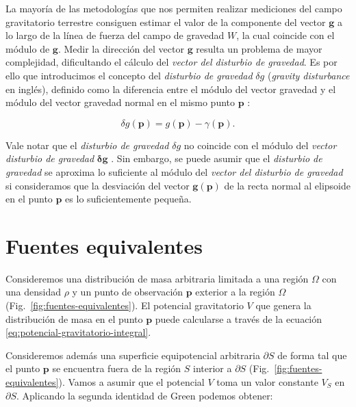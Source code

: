 La mayoría de las metodologías que nos permiten realizar mediciones del campo
gravitatorio terrestre consiguen estimar el valor de la componente del vector
$\mathbf{g}$ a lo largo de la línea de fuerza del campo de gravedad $W$, la
cual coincide con el módulo de $\mathbf{g}$.
Medir la dirección del vector $\mathbf{g}$ resulta un problema de mayor
complejidad, dificultando el cálculo del \emph{vector del disturbio de
gravedad}.
Es por ello que introducimos el concepto del \emph{disturbio de gravedad}
$\delta g$ (\emph{gravity disturbance} en inglés), definido como la diferencia
entre el módulo del vector gravedad y el módulo del vector gravedad normal en
el mismo punto $\mathbf{p}$
\citep{heiskanen1967,hofmannwellenhof2005,oliveira2018}:

\begin{equation}
    \delta g(\mathbf{p}) =
        g(\mathbf{p}) - \gamma(\mathbf{p}).
    \label{eq:gravity-disturbance}
\end{equation}

Vale notar que el \emph{disturbio de gravedad} $\delta g$ no coincide con el
módulo del \emph{vector disturbio de gravedad} $\boldsymbol\delta \mathbf{g}$
\citep{barthelmes2013,sanso2013,oliveira2018}.
Sin embargo, se puede asumir que el \emph{disturbio de gravedad} se aproxima lo
suficiente al módulo del \emph{vector del disturbio de gravedad} si
consideramos que la desviación del vector $\mathbf{g}(\mathbf{p})$ de la recta
normal al elipsoide en el punto $\mathbf{p}$ es lo suficientemente pequeña.


\section{Fuentes equivalentes}

Consideremos una distribución de masa arbitraria limitada a una región $\Omega$
con una densidad $\rho$ y un punto de observación $\mathbf{p}$ exterior a la
región $\Omega$ (Fig.~\ref{fig:fuentes-equivalentes}).
El potencial gravitatorio $V$ que genera la distribución de masa en el punto
$\mathbf{p}$ puede calcularse a través de la ecuación
\ref{eq:potencial-gravitatorio-integral}.

Consideremos además una superficie equipotencial arbitraria $\partial S$ de
forma tal que el punto $\mathbf{p}$ se encuentra fuera de la región $S$
interior a $\partial S$ (Fig.~\ref{fig:fuentes-equivalentes}).
Vamos a asumir que el potencial $V$ toma un valor constante $V_S$ en
$\partial S$.
Aplicando la segunda identidad de Green \citep[][p.~23]{blakely1995} podemos
obtener:

